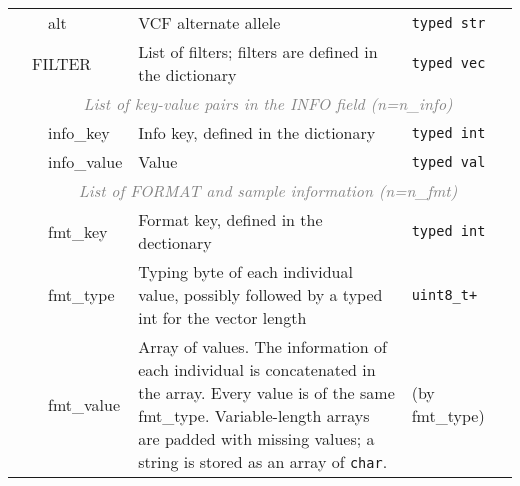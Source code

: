 \documentclass[10pt]{article}
\begin{document}
\begin{table}[ht]
{\begin{tabular}{|l|l|l|p{8.2cm}|l|r|}
  & & {\sf alt} & VCF alternate allele & {\tt typed str} & \\\cline{2-6}
  & \multicolumn{2}{l|}{\sf FILTER} & List of filters; filters are defined in the dictionary & {\tt typed vec} & \\\cline{2-6}
  & \multicolumn{5}{c|}{\textcolor{gray}{\it List of key-value pairs in the INFO field (n=n\_info)}} \\\cline{3-6}
  & & {\sf info\_key} & Info key, defined in the dictionary & {\tt typed int} & \\\cline{3-6}
  & & {\sf info\_value} & Value & {\tt typed val} &\\\cline{2-6}
  & \multicolumn{5}{c|}{\textcolor{gray}{\it List of FORMAT and sample information (n=n\_fmt)}} \\\cline{3-6}
  & & {\sf fmt\_key} & Format key, defined in the dectionary & {\tt typed int} & \\\cline{3-6}
  & & {\sf fmt\_type} & Typing byte of each individual value, possibly followed by a typed int for the vector length & {\tt uint8\_t+} & \\\cline{3-6}
  & & {\sf fmt\_value} & Array of values. The information of each individual is concatenated in the array. Every value is of the same {\sf fmt\_type}.
    Variable-length arrays are padded with missing values; a string is stored as an array of {\tt char}. & (by {\sf fmt\_type}) &\\
  \cline{1-6}
\end{tabular}}
\end{table}
\end{document}
